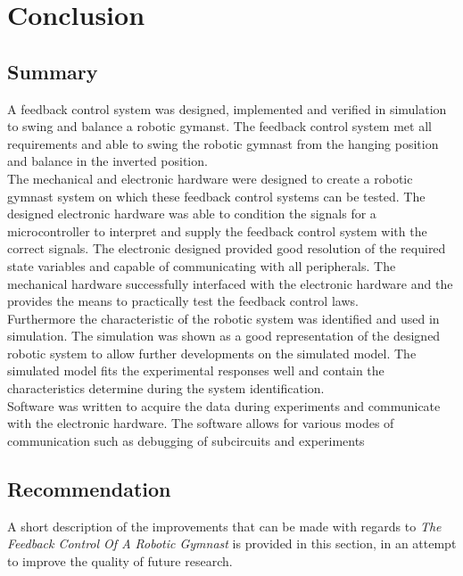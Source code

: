 \chapter{Conclusion}
\label{chp:conclusion}



\section{Summary}
A feedback control system was designed, implemented and verified in simulation to swing and balance a robotic gymanst. The feedback control system met all requirements and able to swing the robotic gymnast from the hanging position and balance in the inverted position.\\
 
The mechanical and electronic hardware were designed to create a robotic gymnast system on which these feedback control systems can be tested. The designed electronic hardware was able to condition the signals for a microcontroller to interpret and supply the feedback control system with the correct signals. The electronic designed provided good resolution of the required state variables and capable of communicating with all peripherals. The mechanical hardware successfully interfaced with the electronic hardware and the provides the means to practically test the feedback control laws.\\

Furthermore the characteristic of the robotic system was identified and used in simulation. The simulation was shown as a good representation of the designed robotic system to allow further developments on the simulated model. The simulated model fits the experimental responses well and contain the characteristics determine during the system identification.\\

Software was written to acquire the data during experiments and communicate with the electronic hardware. The software allows for various modes of communication such as debugging of subcircuits and experiments\\

\section{Recommendation}
A short description of the improvements that can be made with regards to \textit{The Feedback Control Of A Robotic Gymnast} is provided in this section, in an attempt to improve the quality of future research.\\

